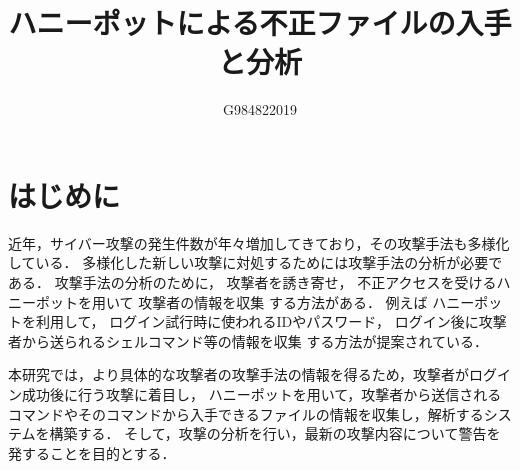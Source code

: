 \documentclass[dvipdfmx]{bta}
\title{ハニーポットによる不正ファイルの入手と分析}
\author{G984822019}{吉村　直将}
\begin{document}
\maketitle

\chapter{はじめに}

近年，サイバー攻撃の発生件数が年々増加してきており，その攻撃手法も多様化している．
多様化した新しい攻撃に対処するためには攻撃手法の分析が必要である．
攻撃手法の分析のために，  攻撃者を誘き寄せ，
不正アクセスを受けるハニーポットを用いて
攻撃者の情報を収集
する方法がある．
例えば
ハニーポットを利用して，
ログイン試行時に使われるIDやパスワード，
ログイン後に攻撃者から送られるシェルコマンド等の情報を収集
する方法が提案されている\cite{Entry}．





本研究では，より具体的な攻撃者の攻撃手法の情報を得るため，攻撃者がログイン成功後に行う攻撃に着目し，
ハニーポットを用いて，攻撃者から送信されるコマンドやそのコマンドから入手できるファイルの情報を収集し，解析するシステムを構築する．
そして，攻撃の分析を行い，最新の攻撃内容について警告を発することを目的とする．
\end{document}
